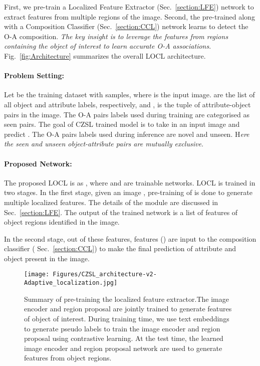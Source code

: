 \documentclass{bmvc2k}
\begin{document}
First, we pre-train a Localized Feature Extractor  (Sec.~\ref{section:LFE}) network to extract features from multiple regions of the image.
Second, the pre-trained  along with a Composition Classifier  (Sec.~\ref{section:CCL}) network learns to detect the O-A composition. \textit{The key insight  is to leverage the features from regions containing the object of interest to learn accurate O-A associations}.  Fig.~\ref{fig:Architecture} summarizes the overall LOCL architecture.
\vspace{-0.2cm}
\paragraph{\textbf{Problem Setting:}} Let  be the training dataset with  samples, where  is the input image.  are the list of all object and attribute labels, respectively, and ,  is the tuple of attribute-object pairs in the image. The O-A pairs labels used during training are categorised as seen pairs. The goal of CZSL trained model is to take in an input image  and predict . The O-A pairs labels used during inference are novel and unseen. H\textit{ere the seen and unseen object-attribute pairs are mutually exclusive.}
\vspace{-0.2cm}
\paragraph{Proposed Network:} The proposed LOCL is as ,
where  and  are trainable networks. LOCL is trained in two stages. In the first stage, given an image , pre-training of  is done to generate multiple localized features. The details of the  module are discussed in Sec.~\ref{section:LFE}. The output of the trained network  is a list of  features of object regions identified in the image.

In the second stage, out of these  features,  features () are input to the composition classifier ( Sec.~\ref{section:CCL}) to make the final prediction of attribute and object present in the image.

\begin{figure*}[t]
\begin{center}
\texttt{[image: Figures/CZSL\_architecture-v2-Adaptive\_localization.jpg]}
\end{center}
 \vspace{-0.4cm}
   \caption{ Summary of pre-training the localized feature extractor.The image encoder and region proposal are jointly trained to generate features of object of interest. During training time, we use text embeddings to generate pseudo labels to train the image encoder and region proposal using contrastive learning. At the test time, the learned image encoder and region proposal network are used to generate features from object regions. 
}
\label{fig:ALM}
\vspace{-0.3cm}
\end{figure*}
\end{document}

